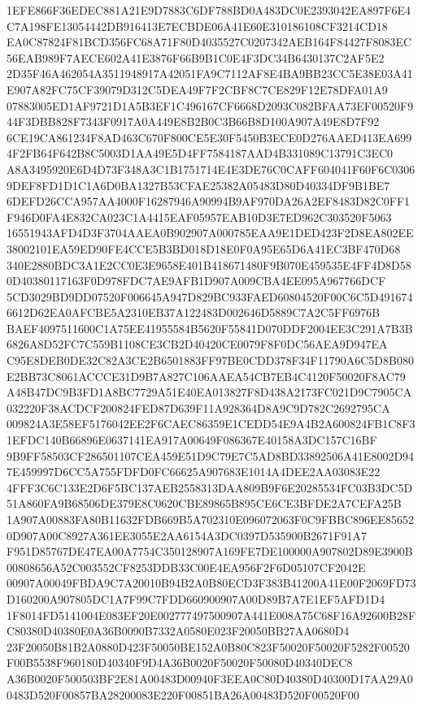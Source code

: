 \documentclass[UTF8,fontset=fandol,zihao=-4,a4paper]{ctexart}
\begin{document}
{{1EFE866F36EDEC881A21E9D7883C6DF788BD0A483DC0E2393042EA897F6E4C7A198FE13054442DB916413E7ECBDE06A41E60E310186108CF3214CD18
EA0C87824F81BCD356FC68A71F80D4035527C0207342AEB164F84427F8083EC56EAB989F7AECE602A41E3876F66B9B1C0E4F3DC34B6430137C2AF5E2
2D35F46A462054A3511948917A42051FA9C7112AF8E4BA9BB23CC5E38E03A41E907A82FC75CF39079D312C5DEA49F7F2CBF8C7CE829F12E78DFA01A9
07883005ED1AF9721D1A5B3EF1C496167CF6668D2093C082BFAA73EF00520F944F3DBB828F7343F0917A0A449E8B2B0C3B66B8D100A907A49E8D7F92
6CE19CA861234F8AD463C670F800CE5E30F5450B3ECE0D276AAED413EA6994F2FB64F642B8C5003D1AA49E5D4FF7584187AAD4B331089C13791C3EC0
A8A3495920E6D4D73F348A3C1B1751714E4E3DE76C0CAFF604041F60F6C03069DEF8FD1D1C1A6D0BA1327B53CFAE25382A05483D80D40334DF9B1BE7
6DEFD26CCA957AA4000F16287946A90994B9AF970DA26A2EF8483D82C0FF1F946D0FA4E832CA023C1A4415EAF05957EAB10D3E7ED962C303520F5063
16551943AFD4D3F3704AAEA0B902907A000785EAA9E1DED423F2D8EA802EE38002101EA59ED90FE4CCE5B3BD018D18E0F0A95E65D6A41EC3BF470D68
340E2880BDC3A1E2CC0E3E9658E401B418671480F9B070E459535E4FF4D8D580D40380117163F0D978FDC7AE9AFB1D907A009CBA4EE095A967766DCF
5CD3029BD9DD07520F006645A947D829BC933FAED60804520F00C6C5D4916746612D62EA0AFCBE5A2310EB37A122483D002646D5889C7A2C5FF6976B
BAEF4097511600C1A75EE41955584B5620F55841D070DDF2004EE3C291A7B3B6826A8D52FC7C559B1108CE3CB2D40420CE0079F8F0DC56AEA9D947EA
C95E8DEB0DE32C82A3CE2B6501883FF97BE0CDD378F34F11790A6C5D8B080E2BB73C8061ACCCE31D9B7A827C106AAEA54CB7EB4C4120F50020F8AC79
A48B47DC9B3FD1A8BC7729A51E40EA013827F8D438A2173FC021D9C7905CA032220F38ACDCF200824FED87D639F11A928364D8A9C9D782C2692795CA
009824A3E58EF5176042EE2F6CAEC86359E1CEDD54E9A4B2A600824FB1C8F31EFDC140B66896E0637141EA917A00649F086367E40158A3DC157C16BF
9B9FF58503CF286501107CEA459E51D9C79E7C5AD8BD33892506A41E8002D947E459997D6CC5A755FDFD0FC66625A907683E1014A4DEE2AA03083E22
4FFF3C6C133E2D6F5BC137AEB2558313DAA809B9F6E20285534FC03B3DC5D51A860FA9B68506DE379E8C0620CBE89865B895CE6CE3BFDE2A7CEFA25B
1A907A00883FA80B11632FDB669B5A702310E096072063F0C9FBBC896EE856520D907A00C8927A361EE3055E2AA6154A3DC0397D535900B2671F91A7
F951D85767DE47EA00A7754C350128907A169FE7DE100000A907802D89E3900B00808656A52C003552CF8253DDB33C00E4EA956F2F6D05107CF2042E
00907A00049FBDA9C7A20010B94B2A0B80ECD3F383B41200A41E00F2069FD73D160200A907805DC1A7F99C7FDD660900907A00D89B7A7E1EF5AFD1D4
1F8014FD5141004E083EF20E002777497500907A441E008A75C68F16A92600B28FC80380D40380E0A36B0090B7332A0580E023F20050BB27AA0680D4
23F20050B81B2A0880D423F50050BE152A0B80C823F50020F50020F5282F00520F00B5538F960180D40340F9D4A36B0020F50020F50080D40340DEC8
A36B0020F500503BF2E81A00483D00940F3EEA0C80D40380D40300D17AA29A00483D520F00857BA28200083E220F00851BA26A00483D520F00520F00
}}
\end{document}
